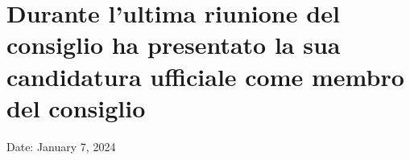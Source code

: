 \section{Durante l'ultima riunione del consiglio ha presentato la sua
candidatura ufficiale come membro del
consiglio}\label{durante-lultima-riunione-del-consiglio-ha-presentato-la-sua-candidatura-ufficiale-come-membro-del-consiglio}

Date: January 7, 2024
